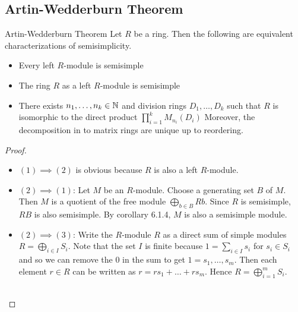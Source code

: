 \documentclass[a4paper]{article}
\begin{document}
\subsection{Artin-Wedderburn Theorem}
\begin{thm}{Artin-Wedderburn Theorem}{} Let $R$ be a ring. Then the following are equivalent characterizations of semisimplicity. 
\begin{itemize}
\item Every left $R$-module is semisimple
\item The ring $R$ as a left $R$-module is semisimple
\item There exists $n_1,\dots,n_k\in\mathbb{N}$ and division rings $D_1,\dots,D_k$ such that $R$ is isomorphic to the direct product $\prod_{i=1}^kM_{n_i}(D_i)$ Moreover, the decomposition in to matrix rings are unique up to reordering. 
\end{itemize} \tcbline
\begin{proof}~\\
\begin{itemize}
\item $(1)\implies(2)$ is obvious because $R$ is also a left $R$-module. 
\item $(2)\implies(1)$: Let $M$ be an $R$-module. Choose a generating set $B$ of $M$. Then $M$ is a quotient of the free module $\bigoplus_{b\in B}Rb$. Since $R$ is semisimple, $RB$ is also semisimple. By corollary 6.1.4, $M$ is also a semisimple module. 
\item $(2)\implies(3)$: Write the $R$-module $R$ as a direct sum of simple modules $R=\bigoplus_{i\in I}S_i$. Note that the set $I$ is finite because $1=\sum_{i\in I}s_i$  for $s_i\in S_i$ and so we can remove the $0$ in the sum to get $1=s_1,\dots,s_m$. Then each element $r\in R$ can be written as $r=rs_1+\dots+rs_m$. Hence $R=\bigoplus_{i=1}^mS_i$. \\~\\


\end{itemize}
\end{proof}
\end{thm}
\end{document}
